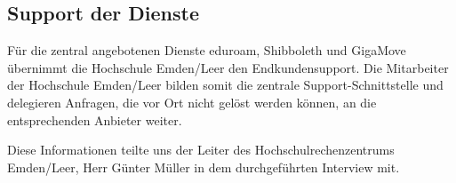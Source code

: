 \subsection{Support der Dienste}
Für die zentral angebotenen Dienste eduroam, Shibboleth und GigaMove übernimmt die Hochschule Emden/Leer den Endkundensupport. Die Mitarbeiter der Hochschule Emden/Leer bilden somit die zentrale Support-Schnittstelle und delegieren Anfragen, die vor Ort nicht gelöst werden können, an die entsprechenden Anbieter weiter.

Diese Informationen teilte uns der Leiter des Hochschulrechenzentrums Emden/Leer, Herr Günter Müller in dem durchgeführten Interview mit.